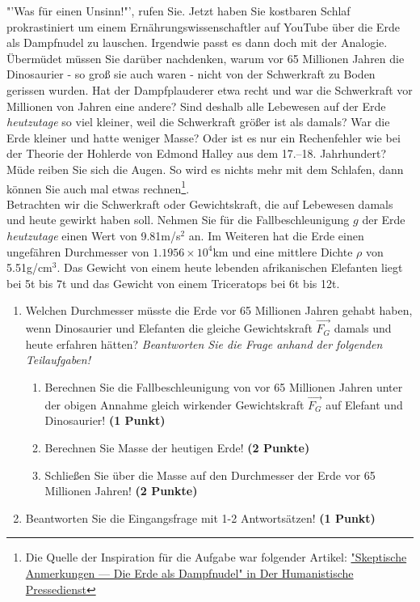 \documentclass[a4paper, 9pt]{scrartcl}\usepackage[]{graphicx}\usepackage[]{xcolor}
\begin{document}
"'Was für einen Unsinn!"', rufen Sie. Jetzt haben Sie kostbaren Schlaf prokrastiniert um einem Ernährungswissenschaftler auf YouTube über die Erde als Dampfnudel zu lauschen. Irgendwie passt es dann doch mit der Analogie. Übermüdet müssen Sie darüber nachdenken, warum vor 65 Millionen Jahren die Dinosaurier - so groß sie auch waren - nicht von der Schwerkraft zu Boden gerissen wurden. Hat der Dampfplauderer etwa recht und war die Schwerkraft vor Millionen von Jahren eine andere?  Sind deshalb alle Lebewesen auf der Erde \textit{heutzutage} so viel kleiner, weil die Schwerkraft größer ist als damals? War die Erde kleiner und hatte weniger Masse? Oder ist es nur ein Rechenfehler wie bei der Theorie der Hohlerde von Edmond Halley aus dem 17.–18. Jahrhundert? Müde reiben Sie sich die Augen. So wird es nichts mehr mit dem Schlafen, dann können Sie auch mal etwas rechnen\footnote{Die Quelle der Inspiration
  für die Aufgabe war folgender Artikel:
  \href{https://hpd.de/artikel/erde-dampfnudel-22236}{"Skeptische Anmerkungen --- Die Erde als Dampfnudel" in Der Humanistische Pressedienst}}.  \\

Betrachten wir die Schwerkraft oder Gewichtskraft, die auf Lebewesen damals und heute gewirkt haben soll. Nehmen Sie für die Fallbeschleunigung $g$ der Erde \textit{heutzutage} einen Wert von 9.81m/s$^2$ an. Im Weiteren hat die Erde einen ungefähren Durchmesser von \ensuremath{1.1956\times 10^{4}}km und eine mittlere Dichte $\rho$ von 5.51g/cm$^3$. Das Gewicht von einem heute lebenden afrikanischen Elefanten liegt bei 5t bis 7t und das Gewicht von einem Triceratops bei 6t bis 12t.

\begin{enumerate}
\item Welchen Durchmesser müsste die Erde vor 65 Millionen Jahren gehabt haben, wenn Dinosaurier und Elefanten die gleiche Gewichtskraft $\overrightarrow{F_G}$ damals und heute erfahren hätten? \textit{Beantworten Sie die Frage anhand der folgenden Teilaufgaben!}
\begin{enumerate}
\item Berechnen Sie die Fallbeschleunigung von vor 65 Millionen Jahren unter der obigen Annahme gleich wirkender Gewichtskraft $\overrightarrow{F_G}$ auf Elefant und Dinosaurier! \textbf{(1 Punkt)}
\item Berechnen Sie Masse der heutigen Erde! \textbf{(2 Punkte)}
\item Schließen Sie über die Masse auf den Durchmesser der Erde vor 65 Millionen Jahren! \textbf{(2 Punkte)}
\end{enumerate}
\item Beantworten Sie die Eingangsfrage mit 1-2 Antwortsätzen! \textbf{(1 Punkt)}
\end{enumerate}
\end{document}
